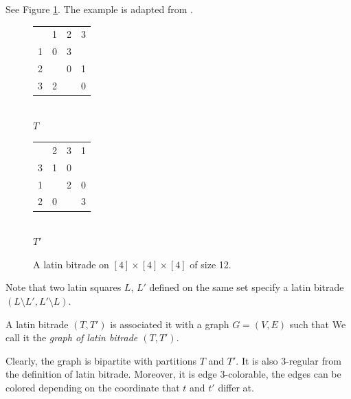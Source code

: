 \begin{exmp}
See Figure \ref{fig:latin-bitrade}. The example is adapted from \cite{Cavenagh08}.

\begin{figure}[htb]
	\centering
	\begin{minipage}{.30\linewidth}
		\begin{center}
		\begin{tabular}{| c c c c |}
			\hline
  & 1 & 2 & 3 \\
1 & 0 & 3 &   \\
2 &   & 0 & 1 \\
3 & 2 &   & 0 \\
			\hline
		\end{tabular} \\
		\bigskip
		$T$
		\end{center}
	\end{minipage}
	\begin{minipage}{.30\linewidth}
		\begin{center}
		\begin{tabular}{| c c c c |}
			\hline
  & 2 & 3 & 1 \\
3 & 1 & 0 &   \\
1 &   & 2 & 0 \\
2 & 0 &   & 3 \\
			\hline
		\end{tabular} \\
		\bigskip
		$T'$
		\end{center}
	\end{minipage}
	\label{fig:latin-bitrade}
	\caption{A latin bitrade on $[4] \times [4] \times [4]$ of size 12.}
\end{figure}

\end{exmp}%

Note that two latin squares $L$, $L'$ defined on the same set specify a latin bitrade $(L \setminus L', L' \setminus L)$.

\begin{defn}
A latin bitrade $(T, T')$ is associated it with a graph $G = (V, E)$ such that
We call it the \emph{graph of latin bitrade $(T, T')$}.
\end{defn}

Clearly, the graph is bipartite with partitions $T$ and $T'$. It is also 3-regular from the definition of latin bitrade. Moreover, it is edge 3-colorable, the edges can be colored depending on the coordinate that $t$ and $t'$ differ at.

